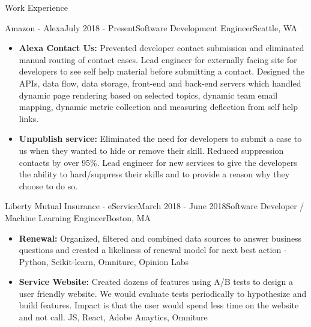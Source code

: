 \documentclass{resume} %
\begin{document}

\begin{rSection}{Work Experience}

\begin{rSubsection}{Amazon - Alexa}{July 2018 - Present}{Software Development Engineer}{Seattle, WA}
\begin{itemize}
    \item \textbf{Alexa Contact Us:} Prevented developer contact submission and eliminated manual routing of contact cases. Lead engineer for externally facing site for developers to see self help material before submitting a contact. Designed the APIs, data flow, data storage, front-end and back-end servers which handled dynamic page rendering based on selected topics, dynamic team email mapping, dynamic metric collection and measuring deflection from self help links.
    \item \textbf{Unpublish service:} Eliminated the need for developers to submit a case to us when they wanted to hide or remove their skill. Reduced suppression contacts by over 95\%. Lead engineer for new services to give the developers the ability to hard/suppress their skills and to provide a reason why they choose to do so. 
\end{itemize}
\end{rSubsection}


\begin{rSubsection}{Liberty Mutual Insurance - eService}{March 2018 - June 2018}{Software Developer / Machine Learning Engineer}{Boston, MA}
\begin{itemize}
    \item \textbf{Renewal:} Organized, filtered and combined data sources to answer business questions and created a likeliness of renewal model for next best action - Python, Scikit-learn, Omniture, Opinion Labs
    \item \textbf{Service Website:} Created dozens of features using A/B tests to design a user friendly website. We would evaluate tests periodically to hypothesize and build features. Impact is that the user would spend less time on the website and not call. JS, React, Adobe Anaytics, Omniture
\end{itemize}
\end{rSubsection}


\end{rSection}
\end{document}
